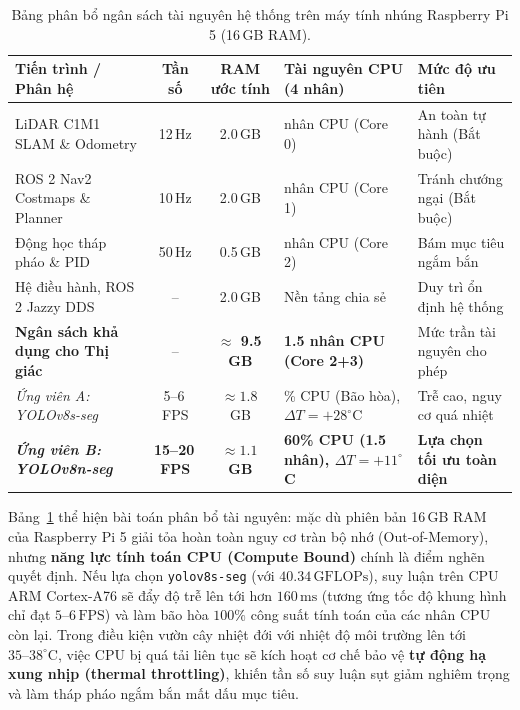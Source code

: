 \documentclass[12pt,a4paper]{article}
\begin{document}
\begin{table}[htbp]
\centering
\footnotesize
\caption{Bảng phân bổ ngân sách tài nguyên hệ thống trên máy tính nhúng Raspberry Pi 5 (16\,GB RAM).}
\label{tab:edge_budget}
\begin{tabularx}{\textwidth}{>{\raggedright\arraybackslash}p{4.2cm} c c >{\raggedright\arraybackslash}p{3.2cm} X}
\toprule
\textbf{Tiến trình / Phân hệ} & \textbf{Tần số} & \textbf{RAM ước tính} & \textbf{Tài nguyên CPU (4 nhân)} & \textbf{Mức độ ưu tiên} \\
\midrule
LiDAR C1M1 SLAM \& Odometry & 12\,Hz & 2.0\,GB & 1 nhân CPU (Core 0) & An toàn tự hành (Bắt buộc) \\
ROS 2 Nav2 Costmaps \& Planner & 10\,Hz & 2.0\,GB & 1 nhân CPU (Core 1) & Tránh chướng ngại (Bắt buộc) \\
Động học tháp pháo \& PID & 50\,Hz & 0.5\,GB & 0.5 nhân CPU (Core 2) & Bám mục tiêu ngắm bắn \\
Hệ điều hành, ROS 2 Jazzy DDS & -- & 2.0\,GB & Nền tảng chia sẻ & Duy trì ổn định hệ thống \\
\midrule
\textbf{Ngân sách khả dụng cho Thị giác} & -- & \textbf{$\approx$ 9.5\,GB} & \textbf{1.5 nhân CPU (Core 2+3)} & Mức trần tài nguyên cho phép \\
\midrule
\textit{Ứng viên A: YOLOv8s-seg} & 5--6\,FPS & $\approx 1.8$\,GB & 100\% CPU (Bão hòa), $\Delta T = +28^\circ$C & Trễ cao, nguy cơ quá nhiệt \\
\textit{\textbf{Ứng viên B: YOLOv8n-seg}} & \textbf{15--20\,FPS} & \textbf{$\approx 1.1$\,GB} & \textbf{60\% CPU (1.5 nhân), $\Delta T = +11^\circ$C} & \textbf{Lựa chọn tối ưu toàn diện} \\
\bottomrule
\end{tabularx}
\end{table}

Bảng~\ref{tab:edge_budget} thể hiện bài toán phân bổ tài nguyên: mặc dù phiên bản 16\,GB RAM của Raspberry Pi 5 giải tỏa hoàn toàn nguy cơ tràn bộ nhớ (Out-of-Memory), nhưng \textbf{năng lực tính toán CPU (Compute Bound)} chính là điểm nghẽn quyết định. Nếu lựa chọn \texttt{yolov8s-seg} (với $40.34\,\text{GFLOPs}$), suy luận trên CPU ARM Cortex-A76 sẽ đẩy độ trễ lên tới hơn $160\,\text{ms}$ (tương ứng tốc độ khung hình chỉ đạt $5\text{--}6\,\text{FPS}$) và làm bão hòa $100\%$ công suất tính toán của các nhân CPU còn lại. Trong điều kiện vườn cây nhiệt đới với nhiệt độ môi trường lên tới $35\text{--}38^\circ\text{C}$, việc CPU bị quá tải liên tục sẽ kích hoạt cơ chế bảo vệ \textbf{tự động hạ xung nhịp (thermal throttling)}, khiến tần số suy luận sụt giảm nghiêm trọng và làm tháp pháo ngắm bắn mất dấu mục tiêu.
\end{document}
